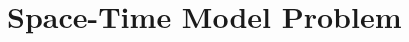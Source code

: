 \documentclass[18pt,xcolor=table]{beamer}
\begin{document}





\section{Space-Time Model Problem}
\end{document}
